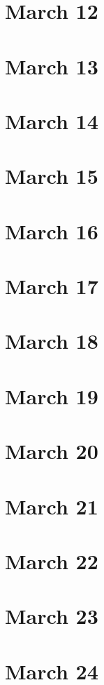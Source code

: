 \section{March 12}

\section{March 13}

\section{March 14}

\section{March 15}

\section{March 16}

\section{March 17}

\section{March 18}

\section{March 19}

\section{March 20}

\section{March 21}

\section{March 22}

\section{March 23}

\section{March 24}

